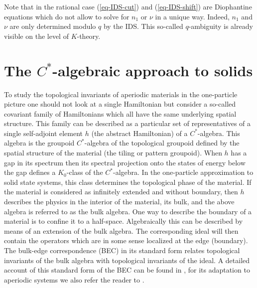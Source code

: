\documentclass[11pt]{amsart}
\begin{document}
Note that in the rational case (\ref{eq-IDS-cut}) and (\ref{eq-IDS-shift}) are Diophantine equations which do not allow to solve for $n_1$ or $\nu$ in a unique way. Indeed, $n_1$ and $\nu$ are only determined modulo $q$ by the IDS. This so-called $q$-ambiguity is already visible on the level of $K$-theory.




\section{The $C^*$-algebraic approach to solids}
To study the topological invariants of aperiodic materials in the one-particle picture one should not look at a single Hamiltonian but consider a so-called covariant family of Hamiltonians which all have the same underlying spatial structure. This family can be described as a particular set of representatives of a single self-adjoint element $h$ (the abstract Hamiltonian) of a $C^*$-algebra. This algebra is the groupoid $C^*$-algebra of the topological groupoid defined by the spatial structure of the material (the tiling or pattern groupoid). When $h$ has a gap in its spectrum then its spectral projection onto the states of energy below the gap defines a $K_0$-class of the $C^*$-algebra. In the one-particle approximation to solid state systems, this class determines the topological phase of the material.
If the material is considered as infinitely extended and without boundary, then $h$ describes the physics in the interior of the material, its bulk, and the above algebra is referred to as the bulk algebra.
One way to describe the boundary of a material is to confine it to a half-space. Algebraically this can be described by means of an extension of the bulk algebra. The corresponding ideal will then contain the operators which are in some sense localized at the edge (boundary). 
The bulk-edge correspondence (BEC) in its standard form relates topological invariants of the bulk algebra with topological invariants of the ideal. A detailed account of this standard form of the BEC can be found in \cite{prodan2016bulk}, for its adaptation to aperiodic systems we also refer the reader to  \cite{kellendonk_prodan,kellendonk2024topological}.
\end{document}
